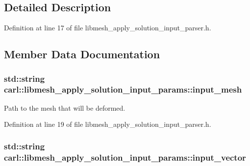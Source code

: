 \subsection{Detailed Description}


Definition at line 17 of file libmesh\+\_\+apply\+\_\+solution\+\_\+input\+\_\+parser.\+h.



\subsection{Member Data Documentation}
\hypertarget{structcarl_1_1libmesh__apply__solution__input__params_a33971a2a268cd16c0cde8b5c409a82c2}{}
\subsubsection[{input\+\_\+mesh}]{\setlength{\rightskip}{0pt plus 5cm}std\+::string carl\+::libmesh\+\_\+apply\+\_\+solution\+\_\+input\+\_\+params\+::input\+\_\+mesh}\label{structcarl_1_1libmesh__apply__solution__input__params_a33971a2a268cd16c0cde8b5c409a82c2}


Path to the mesh that will be deformed. 



Definition at line 19 of file libmesh\+\_\+apply\+\_\+solution\+\_\+input\+\_\+parser.\+h.

\hypertarget{structcarl_1_1libmesh__apply__solution__input__params_a0a4b0ce9385310f7378137e37d67c41f}{}
\subsubsection[{input\+\_\+vector}]{\setlength{\rightskip}{0pt plus 5cm}std\+::string carl\+::libmesh\+\_\+apply\+\_\+solution\+\_\+input\+\_\+params\+::input\+\_\+vector}\label{structcarl_1_1libmesh__apply__solution__input__params_a0a4b0ce9385310f7378137e37d67c41f}


